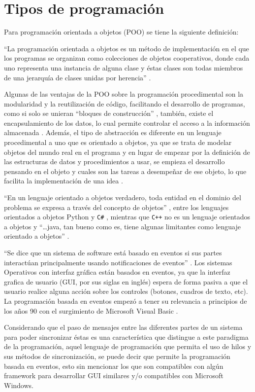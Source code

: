 \section{Tipos de programaci\'on}

Para programaci\'on orientada a objetos (POO) se tiene la siguiente
 definici\'on:


``La programaci\'on orientada a objetos es un m\'etodo de implementaci\'on
 en el que los programas se organizan como colecciones de objetos cooperativos,
 donde cada uno representa una instancia de alguna clase y \'estas clases 
 son todas miembros de una jerarqu\'ia de clases unidas por herencia'' 
 \cite{020189551X}.


Algunas de las ventajas de la POO sobre la programaci\'on procedimental
 son la modularidad y la reutilizaci\'on de c\'odigo, facilitando el 
 desarrollo de programas, como si solo se unieran ``bloques de construcci\'on'' 
 \cite{020189551X}, tambi\'en, existe el encapsulamiento de los datos, lo 
 cual permite controlar el acceso a la informaci\'on almacenada 
 \cite{8448132467}. Adem\'as, el tipo de abstracci\'on es diferente en 
 un lenguaje procedimental a uno que es orientado a objetos, 
 ya que se trata de modelar objetos del mundo real en el programa y en 
 lugar de empezar por la definici\'on de las estructuras de datos y 
 procedimientos a usar, se empieza el desarrollo pensando en el objeto y 
 cuales son las tareas a desempe\~nar de ese objeto, lo que facilita la 
 implementaci\'on de una idea \cite{8448132467}. 


``En un lenguaje orientado a objetos verdadero, toda entidad en el dominio
 del problema se expresa a trav\'es del concepto de objetos'' 
 \cite{8448132467}, entre los lenguajes orientados a objetos Python
 \cite{MarzalVar2014} y \texttt{C\#} \cite{8448132467}, mientras que
 \texttt{C++} \cite{8448132467} no es un lenguaje orientados a objetos y 
 ``\ldots java, tan bueno como es, tiene algunas limitantes como lenguaje 
 orientado a objetos'' \cite{8448132467}.


``Se dice que un sistema de software est\'a basado en eventos si sus partes
 interact\'uan principalmente usando notificaciones de eventos'' 
 \cite{9781430201564}. Los sistemas Operativos con interfaz gr\'afica est\'an 
 basados en eventos, ya que la interfaz grafica de usuario (GUI, por sus siglas en 
 ingl\'es) espera de forma pasiva a que el usuario realice alguna acci\'on sobre 
 los controles \cite{9781430201564} (botones, cuadros de texto, etc). La 
 programaci\'on basada en eventos empez\'o a tener su relevancia a principios de 
 los a\~nos 90 con el surgimiento de Microsoft Visual Basic \cite{9781430201564}.
 
  
Considerando que el paso de mensajes entre las diferentes partes de un sistema
 para poder sincronizar \'estas \cite{9781430201564} es una caracter\'istica que 
 distingue a este paradigma de la programaci\'on, aquel lenguaje de programaci\'on 
 que permita el uso de hilos y sus m\'etodos de sincronizaci\'on, se puede decir 
 que permite la programaci\'on basada en eventos, esto sin mencionar los que son 
 compatibles con alg\'un framework para desarrollar GUI similares y/o compatibles
 con Microsoft Windows.

